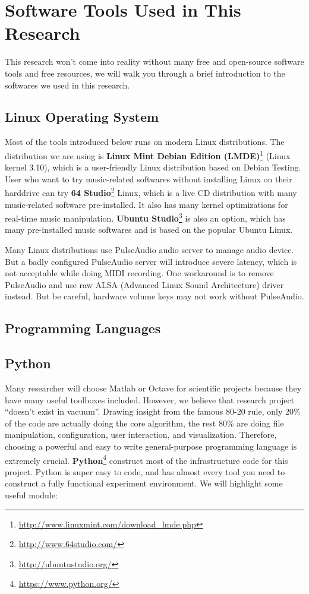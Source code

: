 \chapter{Software Tools Used in This Research} \label{chap:sw} 
This research won't come into reality without many free and open-source software tools and free resources, we will walk you through a brief introduction to the softwares we used in this research. 
\section*{Linux Operating System}
Most of the tools introduced below runs on modern Linux distributions. The distribution we are using is \textbf{Linux Mint Debian Edition (LMDE)}\footnote{\url{http://www.linuxmint.com/download_lmde.php}} (Linux kernel 3.10), which is a user-friendly Linux distribution based on Debian Testing. User who want to try music-related softwares without installing Linux on their harddrive can try \textbf{64 Studio}\footnote{\url{http://www.64studio.com/}} Linux, which is a live CD distribution with many music-related software pre-installed. It also has many kernel optimizations for real-time music manipulation. \textbf{Ubuntu Studio}\footnote{\url{http://ubuntustudio.org/}} is also an option, which has many pre-installed music softwares and is based on the popular Ubuntu Linux.

Many Linux distributions use PulseAudio audio server to manage audio device. But a badly configured PulseAudio server will introduce severe latency, which is not acceptable while doing MIDI recording. One workaround is to remove PulseAudio and use raw ALSA (Advanced Linux Sound Architecture) driver instead. But be careful, hardware volume keys may not work without PulseAudio. 

\section*{Programming Languages}
   \section*{Python}
   Many researcher will choose Matlab or Octave for scientific projects because they have many useful toolboxes included. However, we believe that research project \enquote{doesn't exist in vacuum}. Drawing insight from the famous 80-20 rule, only 20\% of the code are actually doing the core algorithm, the rest 80\% are doing file manipulation, configuration, user interaction, and visualization. Therefore, choosing a powerful and easy to write general-purpose programming language is extremely crucial. \textbf{Python}\footnote{\url{https://www.python.org/}} construct most of the infrastructure code for this project. Python is super easy to code, and has almost every tool you need to construct a fully functional experiment environment. We will highlight some useful module:
